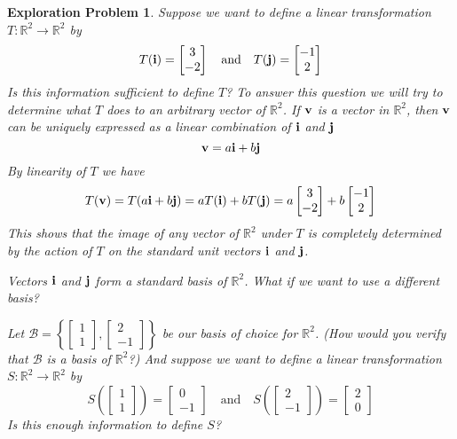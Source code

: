 \documentclass{ximera}
\renewcommand{\vec}[1]{{\bf #1}}
\newcommand{\RR}{\mathbb{R}}
\newtheorem{initprob}{Exploration Problem}
\begin{document}
\begin{initprob}\label{init:tij}  Suppose we want to define a linear transformation $T:\RR^2\rightarrow \RR^2$ by $$T(\vec{i})=\begin{bmatrix}3\\-2\end{bmatrix}\quad\text{and}\quad T(\vec{j})=\begin{bmatrix}-1\\2\end{bmatrix}$$  
Is this information sufficient to define $T$?  
To answer this question we will try to determine what $T$ does to an arbitrary vector of $\RR^2$.  If $\vec{v}$ is a vector in $\RR^2$, then $\vec{v}$ can be uniquely expressed as a linear combination of $\vec{i}$ and $\vec{j}$
$$\vec{v}=a\vec{i}+b\vec{j}$$  By linearity of $T$ we have $$T(\vec{v})=T(a\vec{i}+b\vec{j})=aT(\vec{i})+bT(\vec{j})=a\begin{bmatrix}3\\-2\end{bmatrix}+b\begin{bmatrix}-1\\2\end{bmatrix}$$
This shows that the image of any vector of $\RR^2$ under $T$ is completely determined by the action of $T$ on the standard unit vectors $\vec{i}$ and $\vec{j}$.  

Vectors $\vec{i}$ and $\vec{j}$ form a standard basis of $\RR^2$.  What if we want to use a different basis?  

Let $\mathcal{B}=\left\{\begin{bmatrix}1\\1\end{bmatrix},\begin{bmatrix}2\\-1\end{bmatrix}\right\}$ be our basis of choice for $\RR^2$. (How would you verify that $\mathcal{B}$ is a basis of $\RR^2$?) And suppose we want to define a linear transformation $S:\RR^2\rightarrow \RR^2$ by $$S\left(\begin{bmatrix}1\\1\end{bmatrix}\right)=\begin{bmatrix}0\\-1\end{bmatrix}\quad\text{and}\quad S\left(\begin{bmatrix}2\\-1\end{bmatrix}\right)=\begin{bmatrix}2\\0\end{bmatrix}$$
Is this enough information to define $S$?


\end{initprob}
\end{document}

